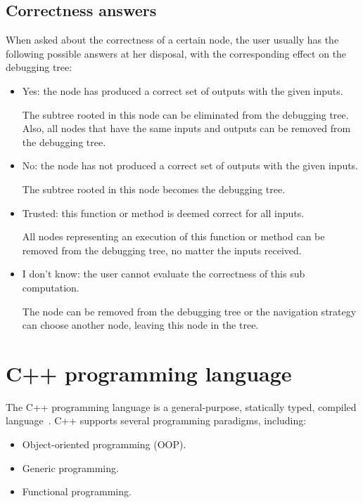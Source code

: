 \subsection{Correctness answers}
When asked about the correctness of a certain node, the user usually has the following possible answers at her disposal, with the corresponding effect on the debugging tree:
\begin{itemize}
    \item Yes: the node has produced a correct set of outputs with the given inputs.
    
    The subtree rooted in this node can be eliminated from the debugging tree.
    Also, all nodes that have the same inputs and outputs can be removed from the debugging tree.
    \item No: the node has not produced a correct set of outputs with the given inputs.
    
    The subtree rooted in this node becomes the debugging tree.
    \item Trusted: this function or method is deemed correct for all inputs.
    
    All nodes representing an execution of this function or method can be removed from the debugging tree, no matter the inputs received.
    \item I don't know: the user cannot evaluate the correctness of this sub computation. 
    
    The node can be removed from the debugging tree or the navigation strategy can choose another node, leaving this node in the tree. 
\end{itemize}

\section{C++ programming language}

The C++ programming language is a general-purpose, statically typed, compiled language~\cite{cppHistory}.
%
C++ supports several programming paradigms, including:

\begin{itemize}
    \item Object-oriented programming (OOP).
    \item Generic programming.
    \item Functional programming.
\end{itemize}

